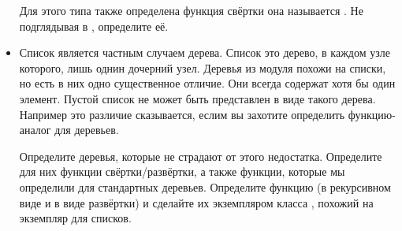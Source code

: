 \begin{itemize}
Для этого типа также определена функция свёртки она
называется . Не подглядывая в ,
определите её. 

\item Список является частным случаем дерева. Список это
    дерево, в каждом узле которого, лишь однин дочерний узел.
    Деревья из модуля  похожи на списки, 
    но есть в них одно существенное отличие. Они всегда
    содержат хотя бы один элемент. Пустой список не может
    быть представлен в виде такого дерева. Например это 
    различие сказывается, еслим вы захотите определить 
    функцию-аналог  для деревьев. 

    Определите деревья, которые не страдают от этого
    недостатка. Определите для них функции свёртки/развёртки,
    а также функции, которые мы определили для стандартных
    деревьев. Определите функцию  (в рекурсивном
    виде и в виде развёртки)
    и сделайте их экземпляром класса , похожий
    на экземпляр для списков.

\end{itemize}

